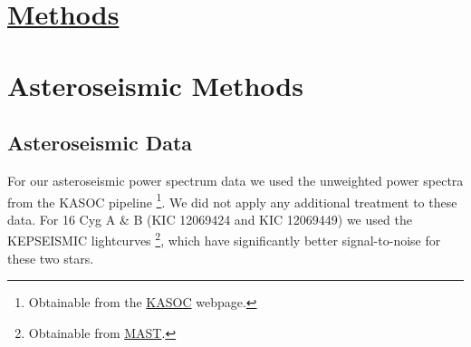 %
%
%
%
%

\section*{\underline{Methods}}
\setcounter{tocdepth}{2}
\tableofcontents
\section{Asteroseismic Methods}
\subsection{Asteroseismic Data}
For our asteroseismic power spectrum data we used the unweighted power spectra from the KASOC pipeline \cite{m_handberg+lund2014}\footnote{Obtainable from the \href{http://kasoc.phys.au.dk/}{KASOC} webpage.}. We did not apply any additional treatment to these data. For 16 Cyg A \& B (KIC 12069424 and KIC 12069449) we used the KEPSEISMIC lightcurves \cite{m_garcia+2011}\footnote{Obtainable from \href{https://archive.
		stsci.edu/prepds/kepseismic/}{MAST}.}, which have significantly better signal-to-noise for these two stars.

